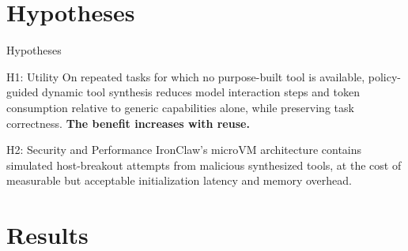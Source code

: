 \documentclass[aspectratio=169,11pt]{beamer}
\begin{document}
\section{Hypotheses}

\begin{frame}{Hypotheses}
  \begin{block}{H1: Utility}
    On repeated tasks for which no purpose-built tool is available,
    policy-guided dynamic tool synthesis reduces model interaction steps and
    token consumption relative to generic capabilities alone, while preserving
    task correctness. \textbf{The benefit increases with reuse.}
  \end{block}
  \vspace{0.35cm}
  \begin{exampleblock}{H2: Security and Performance}
    IronClaw's microVM architecture contains simulated host-breakout attempts
    from malicious synthesized tools, at the cost of measurable but acceptable
    initialization latency and memory overhead.
  \end{exampleblock}
\end{frame}

\section{Results}
\end{document}
